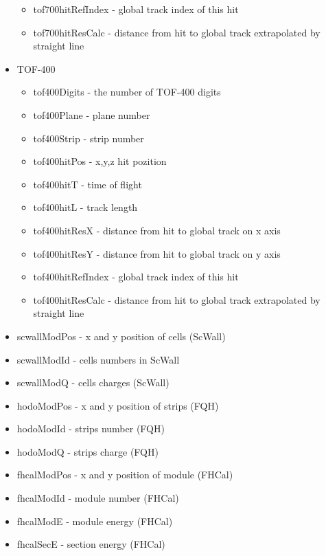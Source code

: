 \begin{itemize}
\begin{itemize}
            \item tof700hitRefIndex - global track index of this hit
            \item tof700hitResCalc - distance from hit to global track extrapolated by straight line 
        \end{itemize}
    \item TOF-400
        \begin{itemize}
            \item tof400Digits - the number of TOF-400 digits
            \item tof400Plane - plane number
            \item tof400Strip - strip number
            \item tof400hitPos - x,y,z hit pozition
            \item tof400hitT - time of flight
            \item tof400hitL - track length
            \item tof400hitResX - distance from hit to global track on x axis
            \item tof400hitResY - distance from hit to global track on y axis
            \item tof400hitRefIndex - global track index of this hit
            \item tof400hitResCalc - distance from hit to global track extrapolated by straight line 
        \end{itemize}
    \item scwallModPos - x and y position of cells (ScWall)
    \item scwallModId - cells numbers in ScWall
    \item scwallModQ - cells charges (ScWall)
    \item hodoModPos - x and y position of strips (FQH)
    \item hodoModId - strips number (FQH)
    \item hodoModQ - strips charge (FQH)
    \item fhcalModPos - x and y position of module (FHCal)
    \item fhcalModId - module number (FHCal)
    \item fhcalModE - module energy (FHCal)
    \item fhcalSecE - section energy (FHCal)

\end{itemize}
